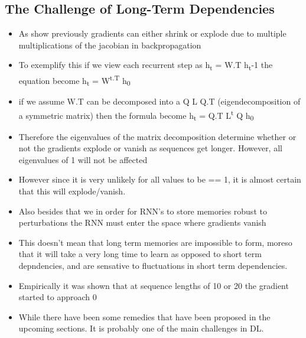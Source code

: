 \documentclass[11pt]{article}
\begin{document}
\subsection{The Challenge of Long-Term Dependencies}
\label{sec:org75fa46e}
\begin{itemize}
\item As show previously gradients can either shrink or explode due to multiple multiplications of the jacobian in backpropagation
\item To exemplify this if we view each recurrent step as h\textsubscript{t} = W.T h\textsubscript{t}-1 the equation become h\textsubscript{t} = W\textsuperscript{t.T} h\textsubscript{0}
\item if we assume W.T can be decomposed into a Q L Q.T (eigendecomposition of a symmetric matrix) then the formula become h\textsubscript{t} = Q.T L\textsuperscript{t} Q h\textsubscript{0}
\item Therefore the eigenvalues of the matrix decomposition determine whether or not the gradients explode or vanish as sequences get longer. However, all eigenvalues of 1 will not be affected
\item However since it is very unlikely for all values to be == 1, it is almost certain that this will explode/vanish.
\item Also besides that we in order for RNN's to store memories robust to perturbations the RNN must enter the space where gradients vanish
\item This doesn't mean that long term memories are impossible to form, moreso that it will take a very long time to learn as opposed to short term depndencies, and are sensative to fluctuations in short term dependencies.
\item Empirically it was shown that at sequence lengths of 10 or 20 the gradient started to approach 0
\item While there have been some remedies that have been proposed in the upcoming sections. It is probably one of the main challenges in DL.
\end{itemize}
\end{document}
